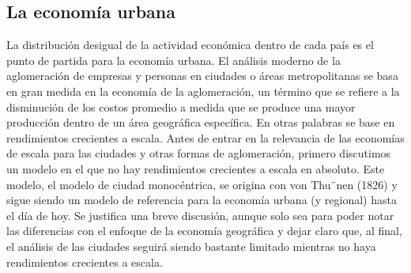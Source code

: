 \subsection{La economía urbana}
La distribución desigual de la actividad económica dentro de cada país es el punto de partida para la economía urbana. El análisis moderno de la aglomeración de empresas y personas en ciudades o áreas metropolitanas se basa en gran medida en la economía de la aglomeración, un término que se refiere a la disminución de los costos promedio a medida que se produce una mayor producción dentro de un área geográfica específica. En otras palabras se base en rendimientos crecientes a escala. Antes de entrar en la relevancia de las economías de escala para las ciudades y otras formas de aglomeración, primero discutimos un modelo en el que no hay rendimientos crecientes a escala en absoluto. Este modelo, el modelo de ciudad monocéntrica, se origina con von Thu¨nen (1826) y sigue siendo un modelo de referencia para la economía urbana (y regional) hasta el día de hoy. Se justifica una breve discusión, aunque solo sea para poder notar las diferencias con el enfoque de la economía geográfica y dejar claro que, al final, el análisis de las ciudades seguirá siendo bastante limitado mientras no haya rendimientos crecientes a escala.

